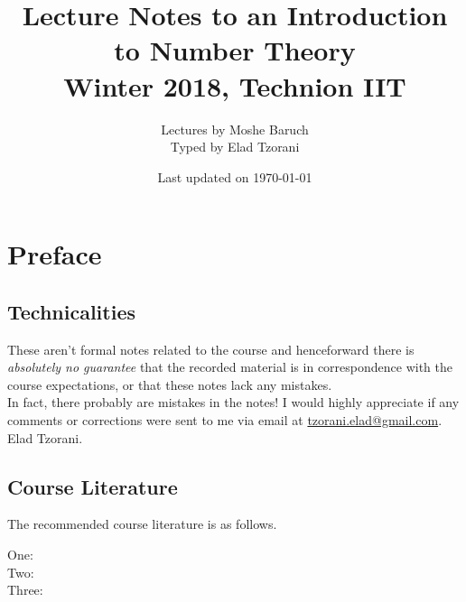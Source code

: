 \documentclass[10pt,a4paper,twoside,openany,hidelinks]{book}
\title{Lecture Notes to an Introduction to Number Theory \\ \large{Winter 2018, Technion IIT}}
\author{Lectures by Moshe Baruch \\ \large Typed by Elad Tzorani}
\date{Last updated on \today}
\begin{document}
\frontmatter
{}
\tableofcontents
\countlectures
\newpage

\chapter*{Preface}
 

\section*{Technicalities}

These aren't formal notes related to the course and henceforward there is \emph{absolutely no guarantee} that the recorded material is in correspondence with the course expectations, or that these notes lack any mistakes.\\
In fact, there probably are mistakes in the notes! I would highly appreciate if any comments or corrections were sent to me via email at \href{mailto:tzorani.elad@gmail.com}{tzorani.elad@gmail.com}.\\
Elad Tzorani.

\section*{Course Literature}

The recommended course literature is as follows.
\begin{description}
\item[One:]

\item[Two:]

\item[Three:]
\end{description}

\mainmatter


\backmatter
\end{document}
